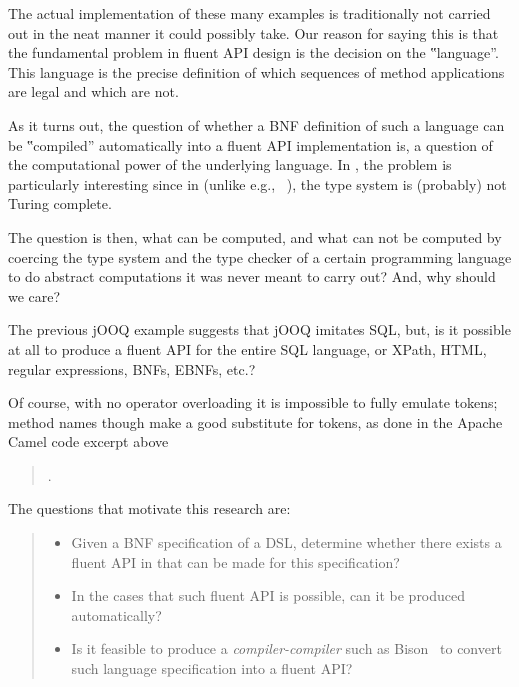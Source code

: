The actual implementation of these many examples is traditionally not carried
out in the neat manner it could possibly take. Our reason for saying this is
that the fundamental problem in fluent API design is the decision on the
‟language”. This language is the precise definition of which sequences of
method applications are legal and which are not.

As it turns out, the question of whether a BNF definition of such a language
can be ‟compiled” automatically into a fluent API implementation is, a
question of the computational power of the underlying language. In \Java, the problem
is particularly interesting since in \Java (unlike e.g., \CC~\cite{Gutterman:2003}),
the type system is (probably) not Turing complete.

The question is then, what can be computed, and what can not be computed by
coercing the type system and the type checker of a certain programming language
to do abstract computations it was never meant to carry out? And, why should we
care?

The previous jOOQ example suggests that jOOQ imitates SQL, but, is it possible
at all to produce a fluent API for the entire SQL language, or XPath, HTML,
regular expressions, BNFs, EBNFs, etc.?

Of course, with no operator overloading it is impossible to fully emulate
tokens; method names though make a good substitute for tokens, as done in the
Apache Camel code excerpt above

\begin{quote}
  .
\end{quote}

The questions that motivate this research are:
\begin{quote}
  \begin{itemize}
    \item Given a BNF specification of a DSL, determine whether there exists a
      fluent API in \Java that can be made for this specification?

    \item In the cases that such fluent API is possible, can it be produced
      automatically?

    \item Is it feasible to produce a \emph{compiler-compiler} such as
      Bison~\cite{Bison:manual} to convert such language specification into a
      fluent API?

\end{itemize}
\end{quote}

